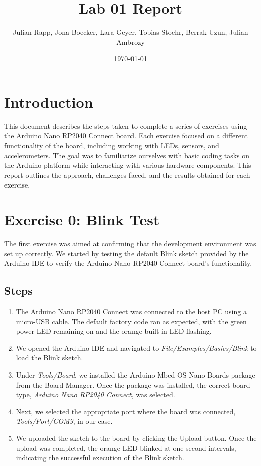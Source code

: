 \documentclass[a4paper,12pt]{article}
\title{Lab 01 Report}
\author{Julian Rapp, Jona Boecker, Lara Geyer, Tobias Stoehr, Berrak Uzun, Julian Ambrozy}
\date{\today}
\begin{document}
	
	\maketitle
	
	\section{Introduction}
	This document describes the steps taken to complete a series of exercises using the Arduino Nano RP2040 Connect board. Each exercise focused on a different functionality of the board, including working with LEDs, sensors, and accelerometers. The goal was to familiarize ourselves with basic coding tasks on the Arduino platform while interacting with various hardware components. This report outlines the approach, challenges faced, and the results obtained for each exercise.
	
	\section{Exercise 0: Blink Test}
	The first exercise was aimed at confirming that the development environment was set up correctly. We started by testing the default Blink sketch provided by the Arduino IDE to verify the Arduino Nano RP2040 Connect board's functionality.
	
	\subsection{Steps}
	\begin{enumerate}
		\item The Arduino Nano RP2040 Connect was connected to the host PC using a micro-USB cable. The default factory code ran as expected, with the green power LED remaining on and the orange built-in LED flashing.
		\item We opened the Arduino IDE and navigated to \textit{File/Examples/Basics/Blink} to load the Blink sketch.
		\item Under \textit{Tools/Board}, we installed the Arduino Mbed OS Nano Boards package from the Board Manager. Once the package was installed, the correct board type, \textit{Arduino Nano RP2040 Connect}, was selected.
		\item Next, we selected the appropriate port where the board was connected, \textit{Tools/Port/COM9}, in our case.
		\item We uploaded the sketch to the board by clicking the Upload button. Once the upload was completed, the orange LED blinked at one-second intervals, indicating the successful execution of the Blink sketch.
	\end{enumerate}
	
\end{document}
